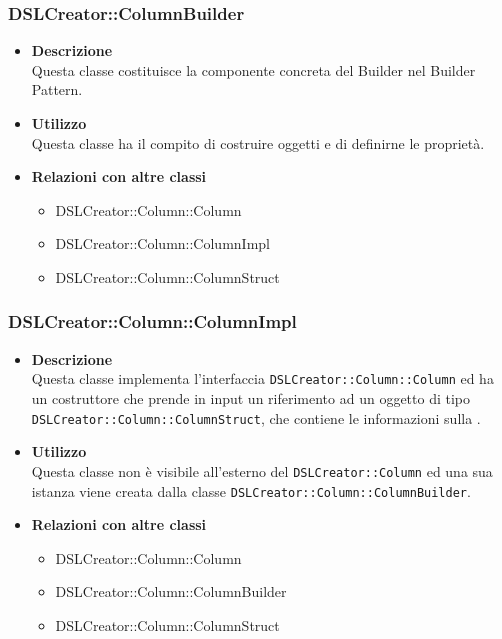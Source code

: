  \subsubsection{DSLCreator::ColumnBuilder}
                    \begin{itemize}
                        \item \textbf{Descrizione} \hfill \\
                          Questa classe costituisce la componente concreta del Builder nel Builder Pattern.
                        \item \textbf{Utilizzo} \hfill \\
                          Questa classe ha il compito di costruire oggetti  e di definirne le proprietà.
                        \item \textbf{Relazioni con altre classi}
                            \begin{itemize}
                              \item DSLCreator::Column::Column
                              \item DSLCreator::Column::ColumnImpl
                              \item DSLCreator::Column::ColumnStruct
                            \end{itemize}
                    \end{itemize}  

 \subsubsection{DSLCreator::Column::ColumnImpl}
                    \begin{itemize}
                        \item \textbf{Descrizione} \hfill \\
                          Questa classe implementa l'interfaccia \texttt{DSLCreator::Column::Column} ed ha un costruttore che prende in input un riferimento ad un oggetto di tipo \texttt{DSLCreator::Co\-lumn::ColumnStruct}, che contiene le informazioni sulla .
                        \item \textbf{Utilizzo} \hfill \\
                          Questa classe non è visibile all'esterno del  \texttt{DSLCreator::Column} ed una sua istanza viene creata dalla classe \texttt{DSLCreator::Column::ColumnBuilder}.
                        \item \textbf{Relazioni con altre classi}
                            \begin{itemize}
                              \item DSLCreator::Column::Column
                              \item DSLCreator::Column::ColumnBuilder
                              \item DSLCreator::Column::ColumnStruct
                            \end{itemize}
                    \end{itemize}  

